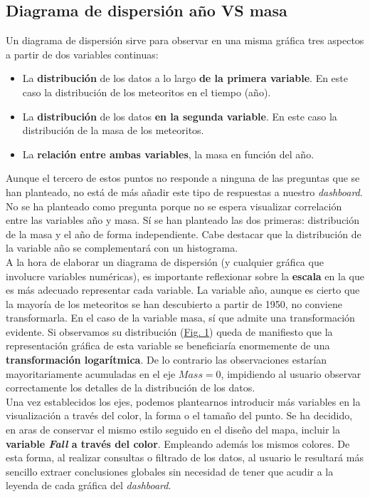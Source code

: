\documentclass[12pt]{article}
\begin{document}
	\subsection{Diagrama de dispersión año VS masa}
	Un diagrama de dispersión sirve para observar en una misma gráfica tres aspectos a partir de dos variables continuas:
	\begin{itemize}
		\item La \textbf{distribución} de los datos a lo largo \textbf{de la primera variable}. En este caso la distribución de los meteoritos en el tiempo (año).
		\item La \textbf{distribución} de los datos \textbf{en la segunda variable}. En este caso la distribución de la masa de los meteoritos.
		\item La \textbf{relación entre ambas variables}, la masa en función del año.
	\end{itemize}	
	Aunque el tercero de estos puntos no responde a ninguna de las preguntas que se han planteado, no está de más añadir este tipo de respuestas a nuestro \textit{dashboard}. No se ha planteado como pregunta porque no se espera visualizar correlación entre las variables año y masa. Sí se han planteado las dos primeras: distribución de la masa y el año de forma independiente. Cabe destacar que la distribución de la variable año se complementará con un histograma.\\
	A la hora de elaborar un diagrama de dispersión (y cualquier gráfica que involucre variables numéricas), es importante reflexionar sobre la \textbf{escala} en la que es más adecuado representar cada variable. La variable año, aunque es cierto que la mayoría de los meteoritos se han descubierto a partir de 1950, no conviene transformarla. En el caso de la variable masa, sí que admite una transformación evidente. Si observamos su distribución (\hyperref[Fig:year_mass]{Fig. 1}) queda de manifiesto que la representación gráfica de esta variable se beneficiaría enormemente de una \textbf{transformación logarítmica}. De lo contrario las observaciones estarían mayoritariamente acumuladas en el eje $ Mass = 0 $, impidiendo al usuario observar correctamente los detalles de la distribución de los datos.\\
	Una vez establecidos los ejes, podemos plantearnos introducir más variables en la visualización a través del color, la forma o el tamaño del punto. Se ha decidido, en aras de conservar el mismo estilo seguido en el diseño del mapa, incluir la \textbf{variable \textit{Fall} a través del color}. Empleando además los mismos colores. De esta forma, al realizar consultas o filtrado de los datos, al usuario le resultará más sencillo extraer conclusiones globales sin necesidad de tener que acudir a la leyenda de cada gráfica del \textit{dashboard}.
\end{document}
